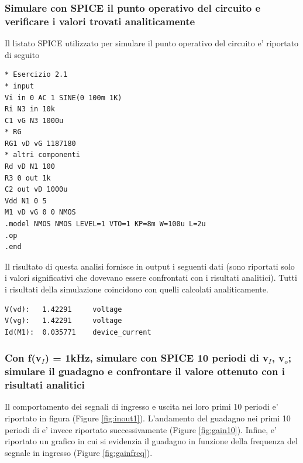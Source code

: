 \documentclass[a4paper,10pt]{article}
\begin{document}
\subsubsection{Simulare con SPICE il punto operativo del circuito e verificare i valori trovati analiticamente}
Il listato SPICE utilizzato per simulare il punto operativo del circuito e' riportato di seguito
\begin{verbatim}
* Esercizio 2.1
* input
Vi in 0 AC 1 SINE(0 100m 1K)
Ri N3 in 10k
C1 vG N3 1000u
* RG
RG1 vD vG 1187180
* altri componenti
Rd vD N1 100
R3 0 out 1k
C2 out vD 1000u
Vdd N1 0 5
M1 vD vG 0 0 NMOS
.model NMOS NMOS LEVEL=1 VTO=1 KP=8m W=100u L=2u
.op
.end
\end{verbatim}
Il risultato di questa analisi fornisce in output i seguenti dati (sono riportati solo i valori significativi che dovevano essere confrontati con i risultati analitici). Tutti i risultati della simulazione coincidono con quelli calcolati analiticamente.
\begin{verbatim}
V(vd):	 1.42291	 voltage
V(vg):	 1.42291	 voltage
Id(M1):	 0.035771	 device_current
\end{verbatim}
\newpage

\subsubsection{Con f(v$_I$) = 1kHz, simulare con SPICE 10 periodi di v$_I$, v$_o$; simulare il guadagno e confrontare il valore ottenuto con i risultati analitici}
Il comportamento dei segnali di ingresso e uscita nei loro primi 10 periodi e' riportato in figura (Figure \ref{fig:inout1}). L'andamento del guadagno nei primi 10 periodi di e' invece riportato successivamente (Figure \ref{fig:gain10}). Infine, e' riportato un grafico in cui si evidenzia il guadagno in funzione della frequenza del segnale in ingresso (Figure \ref{fig:gainfreq}).
\end{document}
